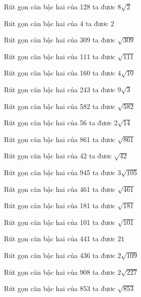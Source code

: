 \documentclass[12pt,a4paper]{article}
\begin{document}
\begin{ex}
Rút gọn căn bậc hai của 128 ta đươc $8\sqrt{2}$
\end{ex}
\begin{ex}
Rút gọn căn bậc hai của 4 ta đươc $2$
\end{ex}
\begin{ex}
Rút gọn căn bậc hai của 309 ta đươc $\sqrt{309}$
\end{ex}
\begin{ex}
Rút gọn căn bậc hai của 111 ta đươc $\sqrt{111}$
\end{ex}
\begin{ex}
Rút gọn căn bậc hai của 160 ta đươc $4\sqrt{10}$
\end{ex}
\begin{ex}
Rút gọn căn bậc hai của 243 ta đươc $9\sqrt{3}$
\end{ex}
\begin{ex}
Rút gọn căn bậc hai của 582 ta đươc $\sqrt{582}$
\end{ex}
\begin{ex}
Rút gọn căn bậc hai của 56 ta đươc $2\sqrt{14}$
\end{ex}
\begin{ex}
Rút gọn căn bậc hai của 861 ta đươc $\sqrt{861}$
\end{ex}
\begin{ex}
Rút gọn căn bậc hai của 42 ta đươc $\sqrt{42}$
\end{ex}
\begin{ex}
Rút gọn căn bậc hai của 945 ta đươc $3\sqrt{105}$
\end{ex}
\begin{ex}
Rút gọn căn bậc hai của 461 ta đươc $\sqrt{461}$
\end{ex}
\begin{ex}
Rút gọn căn bậc hai của 181 ta đươc $\sqrt{181}$
\end{ex}
\begin{ex}
Rút gọn căn bậc hai của 101 ta đươc $\sqrt{101}$
\end{ex}
\begin{ex}
Rút gọn căn bậc hai của 441 ta đươc $21$
\end{ex}
\begin{ex}
Rút gọn căn bậc hai của 436 ta đươc $2\sqrt{109}$
\end{ex}
\begin{ex}
Rút gọn căn bậc hai của 908 ta đươc $2\sqrt{227}$
\end{ex}
\begin{ex}
Rút gọn căn bậc hai của 853 ta đươc $\sqrt{853}$
\end{ex}
\end{document}
